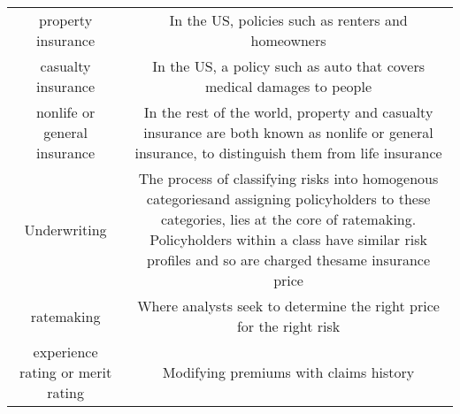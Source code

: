 \documentclass[]{book}
\theoremstyle{definition}
\theoremstyle{definition}
\theoremstyle{definition}
\theoremstyle{remark}
\begin{document}
\begin{longtable}[]{@{}cc@{}}
\begin{minipage}[t]{0.41\columnwidth}
property insurance\strut
\end{minipage} & \begin{minipage}[t]{0.42\columnwidth}\centering\strut
In the US, policies such as renters and homeowners\strut
\end{minipage}\tabularnewline
\begin{minipage}[t]{0.41\columnwidth}\centering\strut
casualty insurance\strut
\end{minipage} & \begin{minipage}[t]{0.42\columnwidth}\centering\strut
In the US, a policy such as auto that covers medical damages to
people\strut
\end{minipage}\tabularnewline
\begin{minipage}[t]{0.41\columnwidth}\centering\strut
nonlife or general insurance\strut
\end{minipage} & \begin{minipage}[t]{0.42\columnwidth}\centering\strut
In the rest of the world, property and casualty insurance are both known
as nonlife or general insurance, to distinguish them from life
insurance\strut
\end{minipage}\tabularnewline
\begin{minipage}[t]{0.41\columnwidth}\centering\strut
Underwriting\strut
\end{minipage} & \begin{minipage}[t]{0.42\columnwidth}\centering\strut
The process of classifying risks into homogenous categoriesand assigning
policyholders to these categories, lies at the core of ratemaking.
Policyholders within a class have similar risk profiles and so are
charged thesame insurance price\strut
\end{minipage}\tabularnewline
\begin{minipage}[t]{0.41\columnwidth}\centering\strut
ratemaking\strut
\end{minipage} & \begin{minipage}[t]{0.42\columnwidth}\centering\strut
Where analysts seek to determine the right price for the right
risk\strut
\end{minipage}\tabularnewline
\begin{minipage}[t]{0.41\columnwidth}\centering\strut
experience rating or merit rating\strut
\end{minipage} & \begin{minipage}[t]{0.42\columnwidth}\centering\strut
Modifying premiums with claims history\strut
\end{minipage}\tabularnewline

\end{longtable}
\end{document}
